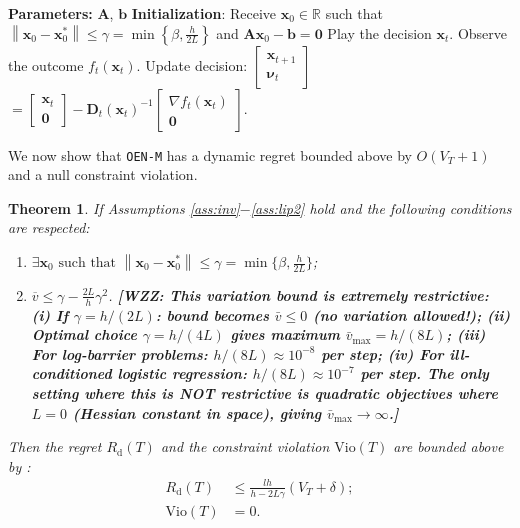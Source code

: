 \documentclass[journal,twoside,web]{ieeecolor}
\newtheorem{theorem}{Theorem}%
\newcommand{\norm}[1]{\left\lVert#1\right\rVert}
\newcommand{\xx}{\mathbf{x}}
\renewcommand{\AA}{\mathbf{A}}
\newcommand{\vv}{\bm{\nu}}
\newcommand{\yy}{\mathbf{y}}
\newcommand{\DD}{\mathbf{D}}
\newcommand{\WZZ}[1]{{\color{red}\bf{[WZZ: #1]}}}
\begin{document}
\begin{algorithm}[h!]
\caption{Online Equality-constrained Newton's Method}\label{alg:OENM}
\begin{algorithmic}
\State\textbf{Parameters:} $\AA$, $\mathbf{b}$
\State\textbf{Initialization}: Receive $\xx_0 \in\mathbb{R}$ such that $\norm{\xx_0-\xx_0^*}\le\gamma=\min\left\{\beta,\frac{h}{2L}\right\}$ and $\AA\xx_0-\mathbf{b}=\mathbf{0}$
\State Play the decision $\xx_t$.
\State Observe the outcome $f_t(\xx_t)$.
\State Update decision:
\State   $\begin{bmatrix}\xx_{t+1}\\ \vv_t\end{bmatrix}$ $=\begin{bmatrix}{\xx}_{t}\\ \mathbf{0}\end{bmatrix}-\DD_t({\xx}_t)^{-1}\begin{bmatrix}\nabla f_t(\xx_t)\\\mathbf{0}\end{bmatrix}$.
\ENDFOR
\end{algorithmic}
\end{algorithm}

We now show that \texttt{OEN-M} has a dynamic regret bounded above by $O(V_T+1)$ and a null constraint violation.

\begin{theorem}
\label{regretOENM}
If Assumptions \ref{ass:inv}$-$\ref{ass:lip2} hold and the following conditions are respected:
\begin{enumerate}
    \item $\exists \xx_0 \text{ such that } \norm{\xx_0-\xx_0^*} \le \gamma = \min\{\beta, \frac{h}{2L}\}$;
    \item $\overline{v} \le \gamma - \frac{2L}{h}\gamma^2$.
\WZZ{This variation bound is extremely restrictive:
(i) If $\gamma = h/(2L)$: bound becomes $\bar{v} \le 0$ (no variation allowed!);
(ii) Optimal choice $\gamma = h/(4L)$ gives maximum $\bar{v}_{\max} = h/(8L)$;
(iii) For log-barrier problems: $h/(8L) \approx 10^{-8}$ per step;
(iv) For ill-conditioned logistic regression: $h/(8L) \approx 10^{-7}$ per step.
The only setting where this is NOT restrictive is quadratic objectives where $L=0$
(Hessian constant in space), giving $\bar{v}_{\max} \to \infty$.}
\end{enumerate}
Then the regret $R_{\text{d}}(T)$ and the constraint violation $\text{Vio}(T)$ are bounded above by :
\begin{align}
\label{eq:regret}
    R_{\text{d}} (T) &\le \frac{lh}{h-2L\gamma}(V_T+\delta);\\
    \text{Vio}(T)&=0.
\end{align}
\end{theorem}
\end{document}
